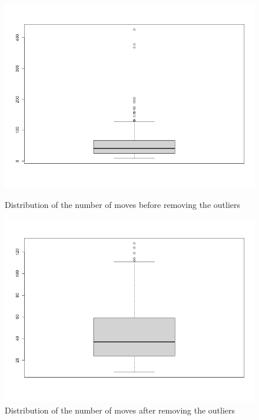 \begin{figure}[tpb]
\centering
	\begin{minipage}[b]{0.46\columnwidth}
	\includegraphics[width=\columnwidth]{img/outliers.png}
	\caption{Distribution of the number of moves before removing the outliers}			
	\label{fig:b1}
	\end{minipage}
	\quad
	\begin{minipage}[b]{0.50\columnwidth}
	\includegraphics[width=\columnwidth]{img/outliers_fixed.png}
	\caption{Distribution of the number of moves after removing the outliers}
	\label{fig:b2}
	\end{minipage}
\end{figure}

